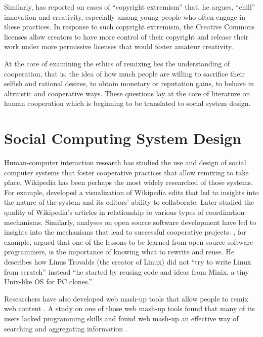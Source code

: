 Similarly, \citet{lessig_remix:_2008} has reported on cases of ``copyright extremism'' that, he argues, ``chill''
 innovation and creativity, especially among young people who often engage in these practices.
In response to such copyright extremism, the Creative Commons licenses allow creators to have more control of their copyright and release their work under more permissive licenses that would foster amateur creativity.

At the core of examining the ethics of remixing lies the understanding of cooperation, that is, the idea of how much people are willing to sacrifice their selfish and rational desires, to obtain monetary or reputation gains, to behave in altruistic and cooperative ways. 
These questions lay at the core of literature on human cooperation which is beginning to be translated to social system design.

\section{Social Computing System Design}

Human-computer interaction research has studied the use and design of social computer systems that foster cooperative practices that allow remixing to take place.
Wikipedia has been perhaps the most widely researched of those systems. 
For example, \citet{viegas_studying_2004} developed a visualization of Wikipedia edits that led to insights into the nature of the system and its editors' ability to collaborate. 
Later \citet{kittur_harnessing_2008} studied the quality of Wikipedia's articles in relationship to various types of coordination mechanisms.
Similarly, analyses on open source software development have led to insights into the mechanisms that lead to successful cooperative projects. 
\citet{raymond_cathedral_1999}, for example, argued that one of the lessons to be learned from open source software programmers, is the importance of knowing what to rewrite and reuse. 
He describes how Linus Trovalds (the creator of Linux) did not ``try to write Linux from scratch'' instead ``he started by reusing code and ideas from Minix, a tiny Unix-like OS for PC clones.'' 

Researchers have also developed web mash-up tools that allow people to remix web content \citep{bolin_automation_2005,wong_making_2007}.
A study on one of those web mash-up tools found that many of its users lacked programming skills and found web mash-up an effective way of searching and aggregating information \citet{nan_zang_whats_2008}.

